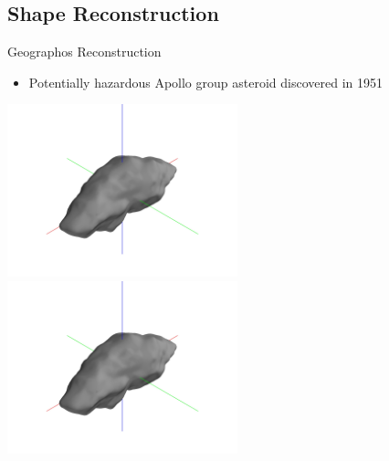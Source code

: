 \subsection{Shape Reconstruction}
\begin{frame}{Geographos Reconstruction}
    \begin{itemize}
        \item Potentially hazardous Apollo group asteroid discovered in 1951
    \end{itemize}
    
    \begin{center}
        \href{https://youtu.be/Fy3b80CP2-0}{\includegraphics[trim={20cm 15cm 20cm 15cm},clip,keepaspectratio,width=0.5\textwidth]{figures/mesh_update/geographos/partial_7489.jpg}}%
        \href{https://youtu.be/UqISXOuV0ZQ}{\includegraphics[trim={20cm 15cm 20cm 15cm},clip,keepaspectratio,width=0.5\textwidth]{figures/mesh_update/geographos/partial_7489.jpg}}
\end{center}

\end{frame}

